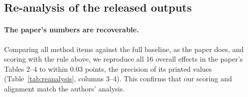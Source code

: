 \documentclass[11pt]{article}
\begin{document}
\subsection{Re-analysis of the released outputs}
\label{sec:reanalysis}

\paragraph{The paper's numbers are recoverable.} Comparing all method items against the full baseline, as the paper does, and scoring with the rule above, we reproduce all 16 overall effects in the paper's Tables 2--4 to within 0.03 points, the precision of its printed values (Table~\ref{tab:reanalysis}, columns 3--4). This confirms that our scoring and alignment match the authors' analysis.
\end{document}
